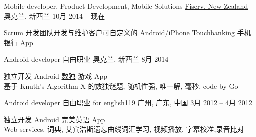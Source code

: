 
\begin{cventries}
	\cventry
	{Mobile developer, Product Development, Mobile Solutions}
	{\href{https://www.careers.fiserv.com/new-zealand}{Fiserv. New Zealand}}
	{奥克兰, \enskip 新西兰}
	{10月 2014 – 现在}
	{
		\begin{cvitems}
			\item {Scrum 开发团队开发与维护客户可自定义的 \href{https://play.google.com/store/apps/details?id=com.fiserv.touchbankingasp&hl=en}{Android}/\href{https://itunes.apple.com/us/app/touchbanking/id386678211?mt=8}{iPhone} Touchbanking 手机银行 App}
		\end{cvitems}
	}
\end{cventries}

\begin{cventries}
	\cventry
	{Android developer}
	{自由职业}
	{奥克兰, \enskip 新西兰}
	{8月 2014}
	{
		\begin{cvitems}
			\item {独立开发 Android \href{https://play.google.com/store/apps/details?id=com.gmail.jiangyang5157.sudoku}{数独} 游戏 App\\
			基于 Knuth’s Algorithm X 的数独谜题, 随机性强, 唯一解, 毫秒,  code by Go}
		\end{cvitems}
	}
\end{cventries}

\begin{cventries}
	\cventry
	{Android developer}
	{自由职业 for \href{http://www.english119.cn}{english119}}
	{广州, \enskip 广东, \enskip 中国}
	{3月 2012 – 4月 2012}
	{
		\begin{cvitems}
			\item {独立开发 Android 完美英语 App\\
				Web services, 词典, 艾宾浩斯遗忘曲线词汇学习, 视频播放, 字幕校准,录音比对}
		\end{cvitems}
	}
\end{cventries}

